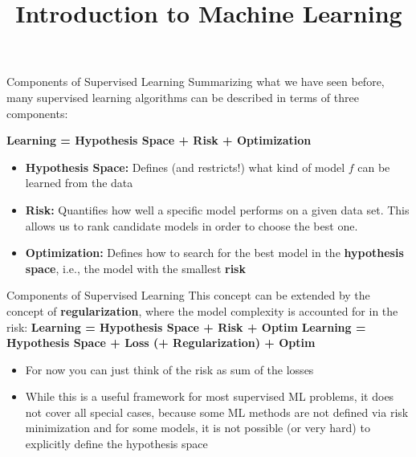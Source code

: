 \documentclass[11pt,compress,t,notes=noshow, xcolor=table]{beamer}
\title{Introduction to Machine Learning}
\begin{document}


\begin{frame2}{Components of Supervised Learning}
Summarizing what we have seen before, many supervised learning algorithms can be described in terms of three components:
\vfill
\begin{center}
\textbf{Learning = Hypothesis Space + Risk + Optimization}
\end{center}
\vfill
\begin{itemize}
\item \textbf{Hypothesis Space:} Defines (and restricts!) what kind of model $f$ can be learned from the data
\item \textbf{Risk:} Quantifies how well a specific model performs on a given data set. This allows us to rank candidate models in order to choose the best one.
\item \textbf{Optimization:} Defines how to search for the best model in the \textbf{hypothesis space}, i.e., the model with the smallest \textbf{risk}
\end{itemize}
\end{frame2}


\begin{frame2}{Components of Supervised Learning}
This concept can be extended by the concept of \textbf{regularization}, where the model complexity is accounted for in the risk:
\vfill
\textbf{Learning = Hypothesis Space +  Risk + Optim }
\textbf{Learning = Hypothesis Space + Loss (+ Regularization) + Optim}
\vfill
\begin{itemize}
\item For now you can just think of the risk as sum of the losses
\item While this is a useful framework for most supervised ML problems, it does not cover all special cases, because some ML methods are not defined via risk minimization and for some models, it is not possible (or very hard) to explicitly define the hypothesis space
\end{itemize}
\end{frame2}
\end{document}
